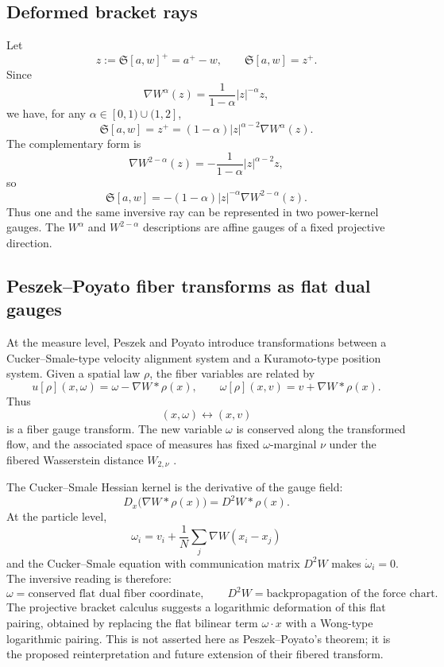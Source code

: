 \documentclass[11pt]{article}
\newcommand{\norm}[1]{\left|#1\right|}
\newcommand{\grad}{\nabla}
\newcommand{\Sbr}[2]{\mathfrak S[#1,#2]}
\begin{document}
\subsection{Deformed bracket rays}


Let
\[
    z:=\Sbr{a}{w}^+=a^+-w,
    \qquad
    \Sbr{a}{w}=z^+.
\]
Since
\[
    \grad W^\alpha(z)=\frac{1}{1-\alpha}\norm z^{-\alpha}z,
\]
we have, for any $\alpha\in [0,1)\cup(1,2]$,
\[
    \boxed{
    \Sbr{a}{w}=z^+=(1-\alpha)\norm z^{\alpha-2}\grad W^\alpha(z).
    }
\]
The complementary form is
\[
    \grad W^{2-\alpha}(z)=-\frac{1}{1-\alpha}\norm z^{\alpha-2}z,
\]
so
\[
    \boxed{
    \Sbr{a}{w}=-(1-\alpha)\norm z^{-\alpha}\grad W^{2-\alpha}(z).
    }
\]
Thus one and the same inversive ray can be represented in two power-kernel gauges.  The $W^\alpha$ and $W^{2-\alpha}$ descriptions are affine gauges of a fixed projective direction.



\subsection{Peszek--Poyato fiber transforms as flat dual gauges}

At the measure level, Peszek and Poyato introduce transformations between a Cucker--Smale-type velocity alignment system and a Kuramoto-type position system.  Given a spatial law $\rho$, the fiber variables are related by
\[
    u[\rho](x,\omega)=\omega-\grad W*\rho(x),
    \qquad
    \omega[\rho](x,v)=v+\grad W*\rho(x).
\]
Thus
\[
    (x,\omega)\longleftrightarrow (x,v)
\]
is a fiber gauge transform.  The new variable $\omega$ is conserved along the transformed flow, and the associated space of measures has fixed $\omega$-marginal $\nu$ under the fibered Wasserstein distance $W_{2,\nu}$ \cite{PeszekPoyato2022Fibered}.

The Cucker--Smale Hessian kernel is the derivative of the gauge field:
\[
    D_x\bigl(\grad W*\rho(x)\bigr)=D^2W*\rho(x).
\]
At the particle level,
\[
    \omega_i=v_i+\frac1N\sum_j\grad W(x_i-x_j)
\]
and the Cucker--Smale equation with communication matrix $D^2W$ makes $\dot\omega_i=0$.  The inversive reading is therefore:
\[
    \boxed{
    \omega=\text{conserved flat dual fiber coordinate},
    \qquad
    D^2W=\text{backpropagation of the force chart}.
    }
\]
The projective bracket calculus suggests a logarithmic deformation of this flat pairing, obtained by replacing the flat bilinear term $\omega\cdot x$ with a Wong-type logarithmic pairing.  This is not asserted here as Peszek--Poyato's theorem; it is the proposed reinterpretation and future extension of their fibered transform.
\end{document}
